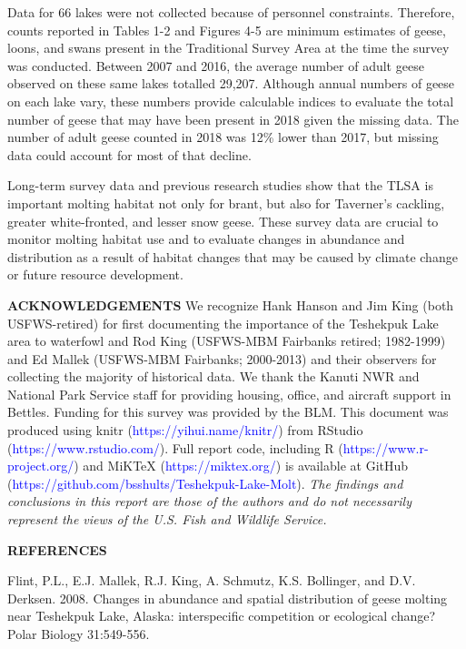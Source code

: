 \documentclass[]{article}
\begin{document}
Data for 66 lakes were not collected because of personnel constraints.
Therefore, counts reported in Tables 1-2 and Figures 4-5 are minimum
estimates of geese, loons, and swans present in the Traditional Survey
Area at the time the survey was conducted. Between 2007 and 2016, the
average number of adult geese observed on these same lakes totalled
29,207. Although annual numbers of geese on each lake vary, these
numbers provide calculable indices to evaluate the total number of geese
that may have been present in 2018 given the missing data. The number of
adult geese counted in 2018 was 12\% lower than 2017, but missing data
could account for most of that decline.

Long-term survey data and previous research studies show that the TLSA
is important molting habitat not only for brant, but also for Taverner's
cackling, greater white-fronted, and lesser snow geese. These survey
data are crucial to monitor molting habitat use and to evaluate changes
in abundance and distribution as a result of habitat changes that may be
caused by climate change or future resource development.

\textbf{ACKNOWLEDGEMENTS}\newline
We recognize Hank Hanson and Jim King (both USFWS-retired) for first
documenting the importance of the Teshekpuk Lake area to waterfowl and
Rod King (USFWS-MBM Fairbanks retired; 1982-1999) and Ed Mallek
(USFWS-MBM Fairbanks; 2000-2013) and their observers for collecting the
majority of historical data. We thank the Kanuti NWR and National Park
Service staff for providing housing, office, and aircraft support in
Bettles. Funding for this survey was provided by the BLM. This document
was produced using knitr (\textcolor{blue}{https://yihui.name/knitr/})
from RStudio (\textcolor{blue}{https://www.rstudio.com/}). Full report
code, including R (\textcolor{blue}{https://www.r-project.org/}) and
MiKTeX (\textcolor{blue}{https://miktex.org/}) is available at GitHub
(\textcolor{blue}{https://github.com/bsshults/Teshekpuk-Lake-Molt}).
\newline
\textit{\small{The findings and conclusions in this report are those of the authors and do not necessarily represent the views of the U.S. Fish and Wildlife Service.}}

\textbf{REFERENCES}

\setlength{\parindent}{-0.2in} \setlength{\leftskip}{0.2in}
\setlength{\parskip}{1ex}

Flint, P.L., E.J. Mallek, R.J. King, A. Schmutz, K.S. Bollinger, and
D.V. Derksen. 2008. Changes in abundance and spatial distribution of
geese molting near Teshekpuk Lake, Alaska: interspecific competition or
ecological change? Polar Biology 31:549-556.
\end{document}
